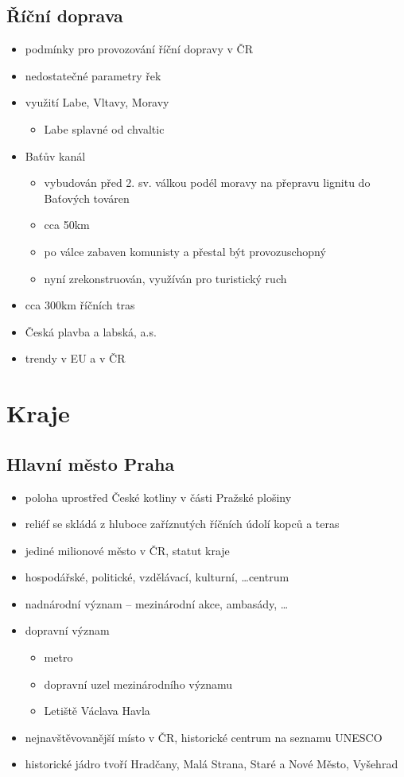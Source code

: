 \subsection{Říční doprava}
\begin{itemize}
\item podmínky pro provozování říční dopravy v ČR
\item nedostatečné parametry řek
\item využití Labe, Vltavy, Moravy
	\begin{itemize}
	\item Labe splavné od chvaltic
	\end{itemize}
\item Baťův kanál	
	\begin{itemize}
	\item vybudován před 2. sv. válkou podél moravy na přepravu lignitu do Baťových továren
	\item cca 50km
	\item po válce zabaven komunisty a přestal být provozuschopný
	\item nyní zrekonstruován, využíván pro turistický ruch
	\end{itemize}
\item cca 300km říčních tras
\item Česká plavba a labská, a.s.
\item trendy v EU a v ČR
\end{itemize}

\section{Kraje}
\subsection{Hlavní město Praha}
\begin{itemize}
\item poloha uprostřed České kotliny v části Pražské plošiny
\item reliéf se skládá z hluboce zaříznutých říčních údolí kopců a teras
\item jediné milionové město v ČR, statut kraje
\item hospodářské, politické, vzdělávací, kulturní, \ldots centrum 
\item nadnárodní význam -- mezinárodní akce, ambasády, \ldots
\item dopravní význam 
	\begin{itemize}
	\item metro
	\item dopravní uzel mezinárodního významu
	\item Letiště Václava Havla
	\end{itemize}
\item nejnavštěvovanější místo v ČR, historické centrum na seznamu UNESCO
\item historické jádro tvoří Hradčany, Malá Strana, Staré a Nové Město, Vyšehrad
\end{itemize}
